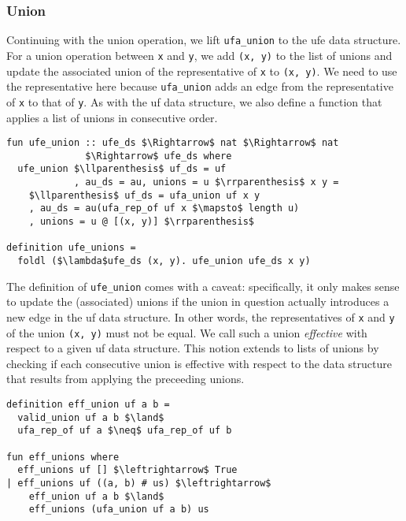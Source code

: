 \documentclass[
  sigplan,
  10pt,
  anonymous,
  review,
  ]{acmart}
\begin{document}
\subsubsection{Union}
Continuing with the union operation, we lift \lstinline|ufa_union| to the \acrshort{ufe} data structure.
For a union operation between \lstinline|x| and \lstinline|y|, we add \lstinline|(x, y)| to the list of unions and update the associated union of the representative of \lstinline|x| to \lstinline|(x, y)|.
We need to use the representative here because \lstinline|ufa_union| adds an edge from the representative of \lstinline|x| to that of \lstinline|y|.
As with the \acrshort{uf} data structure, we also define a function that applies a list of unions in consecutive order.
\begin{lstlisting}
fun ufe_union :: ufe_ds $\Rightarrow$ nat $\Rightarrow$ nat
              $\Rightarrow$ ufe_ds where
  ufe_union $\llparenthesis$ uf_ds = uf
            , au_ds = au, unions = u $\rrparenthesis$ x y =
    $\llparenthesis$ uf_ds = ufa_union uf x y
    , au_ds = au(ufa_rep_of uf x $\mapsto$ length u)
    , unions = u @ [(x, y)] $\rrparenthesis$

definition ufe_unions = 
  foldl ($\lambda$ufe_ds (x, y). ufe_union ufe_ds x y)
\end{lstlisting}
The definition of \lstinline|ufe_union| comes with a caveat:
specifically, it only makes sense to update the (associated) unions if the union in question actually introduces a new edge in the \acrshort{uf} data structure.
In other words, the representatives of \lstinline|x| and \lstinline|y| of the union \lstinline|(x, y)| must not be equal.
We call such a union \emph{effective} with respect to a given \acrshort{uf} data structure.
This notion extends to lists of unions by checking if each consecutive union is effective with respect to the data structure that results from applying the preceeding unions.
\begin{lstlisting}
definition eff_union uf a b =
  valid_union uf a b $\land$
  ufa_rep_of uf a $\neq$ ufa_rep_of uf b

fun eff_unions where
  eff_unions uf [] $\leftrightarrow$ True
| eff_unions uf ((a, b) # us) $\leftrightarrow$
    eff_union uf a b $\land$
    eff_unions (ufa_union uf a b) us
\end{lstlisting}
\end{document}
